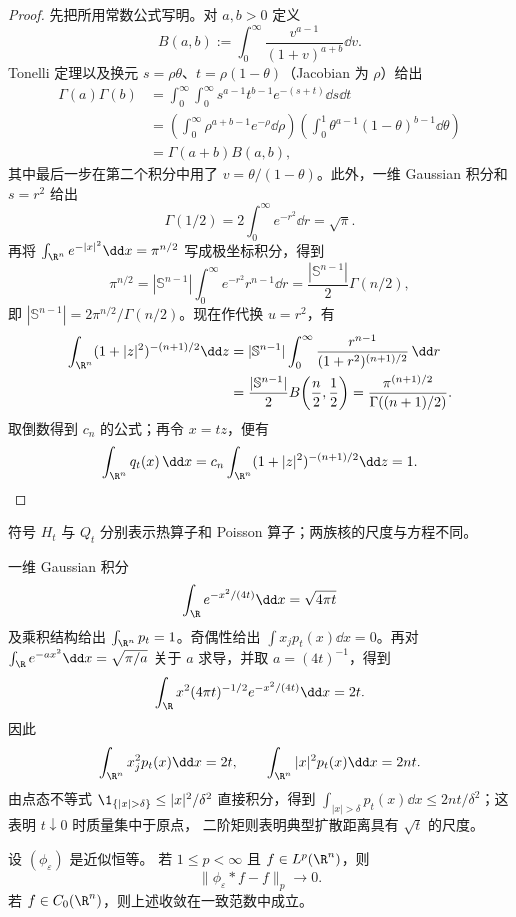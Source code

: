 \begin{proof}
先把所用常数公式写明。对 $a,b>0$ 定义
\[
 B(a,b):=\int_0^\infty
   \frac{v^{a-1}}{(1+v)^{a+b}}\dd v.
\]
Tonelli 定理以及换元
$s=\rho\theta$、$t=\rho(1-\theta)$（Jacobian 为 $\rho$）给出
\begin{align*}
 \Gamma(a)\Gamma(b)
 &=\int_0^\infty\!\int_0^\infty
   s^{a-1}t^{b-1}e^{-(s+t)}\dd s\dd t\\
 &=\left(\int_0^\infty\rho^{a+b-1}e^{-\rho}\dd\rho\right)
   \left(\int_0^1\theta^{a-1}(1-\theta)^{b-1}\dd\theta\right)\\
 &=\Gamma(a+b)B(a,b),
\end{align*}
其中最后一步在第二个积分中用了 $v=\theta/(1-\theta)$。此外，一维 Gaussian 积分和
$s=r^2$ 给出
\[
 \Gamma(1/2)=2\int_0^\infty e^{-r^2}\dd r=\sqrt\pi.
\]
再将 $\int_{\R^n}e^{-|x|^2}\dd x=\pi^{n/2}$ 写成极坐标积分，得到
\[
 \pi^{n/2}=|\mathbb S^{n-1}|\int_0^\infty e^{-r^2}r^{n-1}\dd r
 =\frac{|\mathbb S^{n-1}|}{2}\Gamma(n/2),
\]
即 $|\mathbb S^{n-1}|=2\pi^{n/2}/\Gamma(n/2)$。现在作代换 $u=r^2$，有
\begin{align*}
 \int_{\R^n}(1+|z|^2)^{-(n+1)/2}\dd z
 &=|\mathbb S^{n-1}|\int_0^\infty
   \frac{r^{n-1}}{(1+r^2)^{(n+1)/2}}\,\dd r\\
 &=\frac{|\mathbb S^{n-1}|}{2}B\!\left(\frac n2,\frac12\right)
 =\frac{\pi^{(n+1)/2}}{\Gamma((n+1)/2)}.
\end{align*}
取倒数得到 $c_n$ 的公式；再令 $x=tz$，便有
\[
 \int_{\R^n}q_t(x)\,\dd x
 =c_n\int_{\R^n}(1+|z|^2)^{-(n+1)/2}\dd z=1.
\]
\end{proof}

符号 $H_t$ 与 $Q_t$ 分别表示热算子和 Poisson 算子；两族核的尺度与方程不同。

\begin{example}[热核的质量与扩散尺度]\label{ex:4-4-2-2}
一维 Gaussian 积分
\[
 \int_\R e^{-x^2/(4t)}\dd x=\sqrt{4\pi t}
\]
及乘积结构给出 $\int_{\R^n}p_t=1$。奇偶性给出
$\int x_jp_t(x)\dd x=0$。再对
$\int_\R e^{-a x^2}\dd x=\sqrt{\pi/a}$ 关于 $a$ 求导，并取 $a=(4t)^{-1}$，得到
\[
 \int_\R x^2(4\pi t)^{-1/2}e^{-x^2/(4t)}\dd x=2t.
\]
因此
\[
 \int_{\R^n}x_j^2p_t(x)\dd x=2t,
 \qquad \int_{\R^n}|x|^2p_t(x)\dd x=2nt.
\]
由点态不等式
$\1_{\{|x|>\delta\}}\le |x|^2/\delta^2$ 直接积分，得到
$\int_{|x|>\delta}p_t(x)\dd x\le2nt/\delta^2$；这表明 $t\downarrow0$ 时质量集中于原点，
二阶矩则表明典型扩散距离具有 $\sqrt t$ 的尺度。
\end{example}

\begin{theorem}[近似恒等的范数收敛]\label{theorem:4-4-2-1}
设 $(\phi_\varepsilon)$ 是近似恒等。
若 $1\le p<\infty$ 且 $f\in L^p(\R^n)$，则
\[
 \|\phi_\varepsilon*f-f\|_p\longrightarrow0.
\]
若 $f\in C_0(\R^n)$，则上述收敛在一致范数中成立。
\end{theorem}

